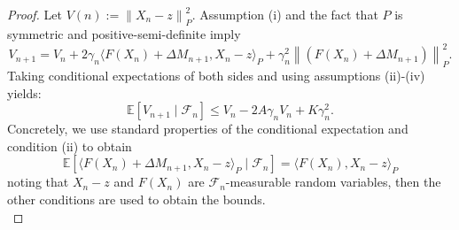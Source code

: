 \documentclass[12pt]{amsart}
\theoremstyle{definition}
\theoremstyle{remark}
\newcommand{\norm}[1]{\left\lVert#1\right\rVert}
\newcommand{\EE}{\mathbb{E}}
\begin{document}
\begin{proof}
    Let $V(n):= \norm{X_n -z}_P^2$. Assumption (i) and the fact that $P$ is symmetric and positive-semi-definite imply
    \[
    V_{n+1} = V_n + 2\gamma_{n}\langle F(X_n)+\Delta M_{n+1}, X_n -z \rangle_P +\gamma_{n}^2\norm{(F(X_n)+\Delta M_{n+1})}_P^2.
    \]
    Taking conditional expectations of both sides and using assumptions (ii)-(iv) yields:
    \[
     \EE[V_{n+1}\mid \mathcal{F}_n] \le V_n -2A\gamma_{n}V_n 
     +K\gamma_n^2.\tag{$\dagger$}
    \]
Concretely, we use standard properties of the conditional expectation and condition (ii) to obtain
\[
\EE[\langle F(X_n)+\Delta M_{n+1}, X_n -z \rangle_P \mid \mathcal{F}_n] = \langle F(X_n), X_n -z \rangle_P
\]
noting that $X_n-z$ and $F(X_n)$ are $\mathcal{F}_n$-measurable random variables, then the other conditions are used to obtain the bounds.\\ 


\end{proof}
\end{document}
